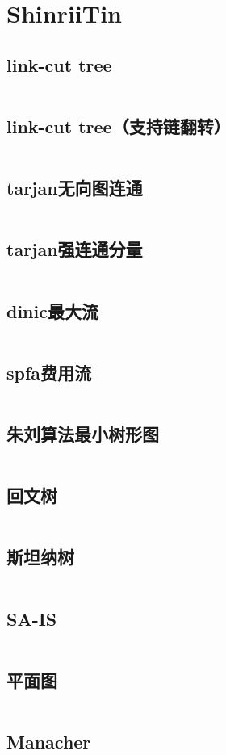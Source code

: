 \chapter{ShinriiTin}
\section{link-cut tree}
\inputminted{cpp}{\source/ShinriiTin/link-cut-tree.cpp}
\section{link-cut tree（支持链翻转）}
\inputminted{cpp}{\source/ShinriiTin/reversable_link-cut-tree.cpp}
\section{tarjan无向图连通}
\inputminted{cpp}{\source/ShinriiTin/undirected-tarjan.cpp}
\section{tarjan强连通分量}
\inputminted{cpp}{\source/ShinriiTin/scc-tarjan.cpp}
\section{dinic最大流}
\inputminted{cpp}{\source/ShinriiTin/dinic.cpp}
\section{spfa费用流}
\inputminted{cpp}{\source/ShinriiTin/spfa_mcmf.cpp}
\section{朱刘算法最小树形图}
\inputminted{cpp}{\source/ShinriiTin/zhuliu.cpp}
\section{回文树}
\inputminted{cpp}{\source/ShinriiTin/palindrome_tree.cpp}
\section{斯坦纳树}
\inputminted{cpp}{\source/ShinriiTin/Steiner_Tree.cpp}
\section{SA-IS}
\inputminted{cpp}{\source/ShinriiTin/SA_IS.cpp}
\section{平面图}
\inputminted{cpp}{\source/ShinriiTin/WC2013_clj.cpp}
\section{Manacher}
\inputminted{cpp}{\source/ShinriiTin/Manacher.cpp}